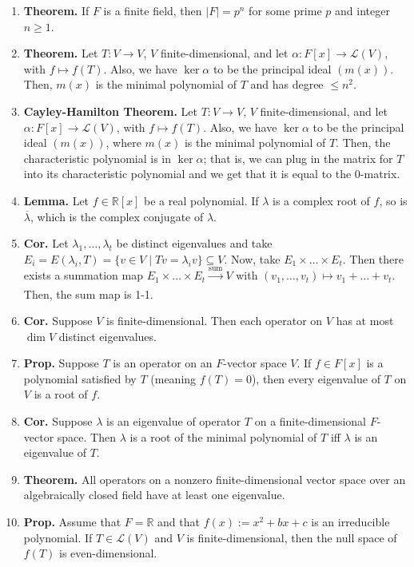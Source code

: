 \begin{enumerate}
	\item \textbf{Theorem. } If $F$ is a finite field, then $|F|=p^n$ for some prime $p$ and integer $n \geq 1$. 
	\item \textbf{Theorem. } Let $T: V \to V$, $V$ finite-dimensional, and let $\alpha: F[x] \to \mathscr{L}(V)$, with $f \mapsto f(T)$. Also, we have $\ker\alpha$ to be the principal ideal $(m(x))$. Then, $m(x)$ is the minimal polynomial of $T$ and has degree $\leq n^2$. 
	\item \textbf{Cayley-Hamilton Theorem. } Let $T: V \to V$, $V$ finite-dimensional, and let $\alpha: F[x] \to \mathscr{L}(V)$, with $f \mapsto f(T)$. Also, we have $\ker\alpha$ to be the principal ideal $(m(x))$, where $m(x)$ is the minimal polynomial of $T$. Then, the characteristic polynomial is in $\ker\alpha$; that is, we can plug in the matrix for $T$ into its characteristic polynomial and we get that it is equal to the 0-matrix. 
	\item \textbf{Lemma. } Let $f \in \mathbb{R}[x]$ be a real polynomial. If $\lambda$ is a complex root of $f$, so is $\overline{\lambda}$, which is the complex conjugate of $\lambda$. 
	\item \textbf{Cor. } Let $\lambda_1,\dots,\lambda_t$ be distinct eigenvalues and take $E_i = E(\lambda_i,T) = \{v \in V \mid Tv = \lambda_iv\} \subseteq V$. Now, take $E_1 \times \dots \times E_t$. Then there exists a summation map $E_1 \times \dots \times E_t \xrightarrow[]{\textrm{sum}} V$ with $(v_1,\dots,v_t) \mapsto v_1 + \dots + v_t$. Then, the sum map is 1-1. 
	\item \textbf{Cor. } Suppose $V$ is finite-dimensional. Then each operator on $V$ has at most $\dim V$ distinct eigenvalues. 
	\item \textbf{Prop. } Suppose $T$ is an operator on an $F$-vector space $V$. If $f \in F[x]$ is a polynomial satisfied by $T$ (meaning $f(T)=0$), then every eigenvalue of $T$ on $V$ is a root of $f$. 
	\item \textbf{Cor. } Suppose $\lambda$ is an eigenvalue of operator $T$ on a finite-dimensional $F$-vector space. Then $\lambda$ is a root of the minimal polynomial of $T$ iff $\lambda$ is an eigenvalue of $T$. 
	\item \textbf{Theorem. } All operators on a nonzero finite-dimensional vector space over an algebraically closed field have at least one eigenvalue. 
	\item \textbf{Prop. } Assume that $F = \mathbb{R}$ and that $f(x) := x^2 + bx + c$ is an irreducible polynomial. If $T \in \mathscr{L}(V)$ and $V$ is finite-dimensional, then the null space of $f(T)$ is even-dimensional. 

\end{enumerate}
